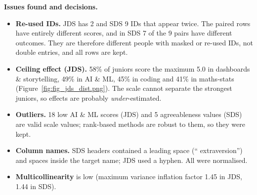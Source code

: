 \textbf{Issues found and decisions.}
\begin{itemize}
  \item \textbf{Re-used IDs.} JDS has 2 and SDS 9 IDs that appear twice. The paired rows have
        entirely different scores, and in SDS 7 of the 9 pairs have different outcomes. They are
        therefore different people with masked or re-used IDs, not double entries, and all rows
        are kept.
  \item \textbf{Ceiling effect (JDS).} 58\% of juniors score the maximum 5.0 in dashboards \&
        storytelling, 49\% in AI \& ML, 45\% in coding and 41\% in maths-stats
        (Figure~\ref{fig:fig_jds_dist.png}). The scale cannot separate the strongest juniors, so
        effects are probably \emph{under}-estimated.
  \item \textbf{Outliers.} 18 low AI \& ML scores (JDS) and 5 agreeableness values (SDS) are valid
        scale values; rank-based methods are robust to them, so they were kept.
  \item \textbf{Column names.} SDS headers contained a leading space (`` extraversion'') and spaces
        inside the target name; JDS used a hyphen. All were normalised.
  \item \textbf{Multicollinearity} is low (maximum variance inflation factor 1.45 in JDS, 1.44 in SDS).
\end{itemize}

